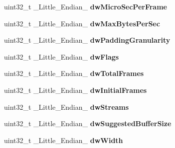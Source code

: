 \begin{DoxyCompactItemize}
\item 
\hypertarget{structGCC__ATTRIBUTE_a754886950001fe79fa06ef55733d0905}{uint32\-\_\-t \-\_\-\-Little\-\_\-\-Endian\-\_\- {\bfseries dw\-Micro\-Sec\-Per\-Frame}}\label{structGCC__ATTRIBUTE_a754886950001fe79fa06ef55733d0905}

\item 
\hypertarget{structGCC__ATTRIBUTE_ad4a986aade472bc9972fcca6affbb69d}{uint32\-\_\-t \-\_\-\-Little\-\_\-\-Endian\-\_\- {\bfseries dw\-Max\-Bytes\-Per\-Sec}}\label{structGCC__ATTRIBUTE_ad4a986aade472bc9972fcca6affbb69d}

\item 
\hypertarget{structGCC__ATTRIBUTE_a1d32a3f30638fdc9958573b0613d8242}{uint32\-\_\-t \-\_\-\-Little\-\_\-\-Endian\-\_\- {\bfseries dw\-Padding\-Granularity}}\label{structGCC__ATTRIBUTE_a1d32a3f30638fdc9958573b0613d8242}

\item 
\hypertarget{structGCC__ATTRIBUTE_ae21793ea014d0d72e4cbd6a685856674}{uint32\-\_\-t \-\_\-\-Little\-\_\-\-Endian\-\_\- {\bfseries dw\-Flags}}\label{structGCC__ATTRIBUTE_ae21793ea014d0d72e4cbd6a685856674}

\item 
\hypertarget{structGCC__ATTRIBUTE_ad2e5f7dc18588ee5a06a54187d834146}{uint32\-\_\-t \-\_\-\-Little\-\_\-\-Endian\-\_\- {\bfseries dw\-Total\-Frames}}\label{structGCC__ATTRIBUTE_ad2e5f7dc18588ee5a06a54187d834146}

\item 
\hypertarget{structGCC__ATTRIBUTE_aefd607967fd519a3bac0b637c7e4ba5e}{uint32\-\_\-t \-\_\-\-Little\-\_\-\-Endian\-\_\- {\bfseries dw\-Initial\-Frames}}\label{structGCC__ATTRIBUTE_aefd607967fd519a3bac0b637c7e4ba5e}

\item 
\hypertarget{structGCC__ATTRIBUTE_adcc4e37b154b4abab6ab84671bfe62bd}{uint32\-\_\-t \-\_\-\-Little\-\_\-\-Endian\-\_\- {\bfseries dw\-Streams}}\label{structGCC__ATTRIBUTE_adcc4e37b154b4abab6ab84671bfe62bd}

\item 
\hypertarget{structGCC__ATTRIBUTE_ab34db2bdfd65aa01f5f5dffb5bdf20fd}{uint32\-\_\-t \-\_\-\-Little\-\_\-\-Endian\-\_\- {\bfseries dw\-Suggested\-Buffer\-Size}}\label{structGCC__ATTRIBUTE_ab34db2bdfd65aa01f5f5dffb5bdf20fd}

\item 
\hypertarget{structGCC__ATTRIBUTE_a7cb46d41e5a1acde2572c1df93d493cf}{uint32\-\_\-t \-\_\-\-Little\-\_\-\-Endian\-\_\- {\bfseries dw\-Width}}\label{structGCC__ATTRIBUTE_a7cb46d41e5a1acde2572c1df93d493cf}


\end{DoxyCompactItemize}
